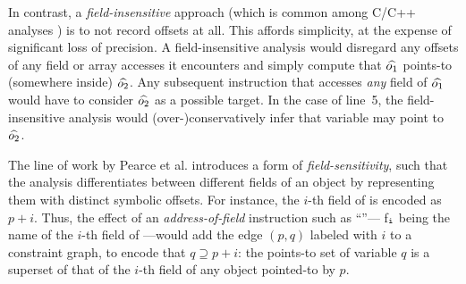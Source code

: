 In contrast, a \emph{field-insensitive} approach (which is common
among C/C++ analyses
\cite{antgrasshopper,toplas/HindBCC99,popl/ZhengR08,pldi/HeintzeT01a,pldi/Das00,sas/HardekopfL07})
is to not record offsets at all. This affords simplicity, at the
expense of significant loss of precision. A field-insensitive analysis
would disregard any offsets of any field or array accesses it
encounters and simply compute that $\widehat{o_1}$ points-to (somewhere
inside) $\widehat{o_2}$. Any subsequent instruction that accesses
\emph{any} field of $\widehat{o_1}$ would have to consider $\widehat{o_2}$
as a possible target. In the case of line~5, the field-insensitive
analysis would (over-)conservatively infer that variable 
may point to $\widehat{o_2}$.




The line of work by Pearce et al.
\cite{paste/PearceKH04,toplas/PearceKH07} introduces a form of
\emph{field-sensitivity}, such that the analysis differentiates between
different fields of an object by representing them with distinct
symbolic offsets. For instance, the $i$-th field of  is
encoded as $p + i$. Thus, the effect of an \emph{address-of-field}
instruction such as ``''---
f$_{\texttt{i}}$ being the name of the $i$-th field of ---would
add the edge $(p,q)$ labeled with $i$ to a constraint graph, to
encode that $q \supseteq p + i$: the points-to set of variable $q$
is a superset of that of the $i$-th field of any object pointed-to
by $p$.

